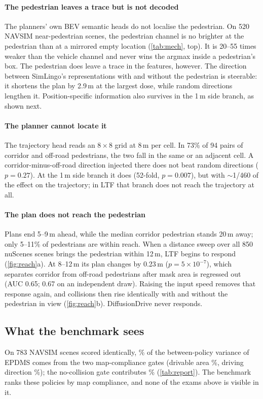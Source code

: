 \paragraph{The pedestrian leaves a trace but is not decoded}
The planners' own BEV semantic heads do not localise the pedestrian. On 520 NAVSIM near-pedestrian
scenes, the pedestrian channel is no brighter at the pedestrian than at a mirrored empty location
(\cref{tab:mech}, top). It is 20--55 times weaker than the vehicle channel and never wins the argmax
inside a pedestrian's box. The pedestrian does leave a trace in the features, however. The direction
between SimLingo's representations with and without the pedestrian is steerable: it shortens the plan
by 2.9\,m at the largest dose, while random directions lengthen it. Position-specific information also
survives in the 1\,m side branch, as shown next.

\paragraph{The planner cannot locate it}
The trajectory head reads an $8\times8$ grid at 8\,m per cell. In 73\% of 94 pairs of corridor and
off-road pedestrians, the two fall in the same or an adjacent cell. A corridor-minus-off-road direction
injected there does not beat random directions ($p=0.27$). At the 1\,m side branch it does (52-fold,
$p=0.007$), but with $\sim$1/460 of the effect on the trajectory; in LTF that branch does not reach
the trajectory at all.

\paragraph{The plan does not reach the pedestrian}
Plans end 5--9\,m ahead, while the median corridor pedestrian stands 20\,m away; only 5--11\% of
pedestrians are within reach. When a distance sweep over all 850 nuScenes scenes brings the pedestrian
within 12\,m, LTF begins to respond (\cref{fig:reach}a). At 8--12\,m its
plan changes by 0.23\,m ($p=5\times10^{-7}$), which separates corridor from off-road pedestrians after
mask area is regressed out (AUC 0.65; 0.67 on an independent draw). Raising the input speed removes
that response again, and collisions then rise identically with and without the pedestrian in view
(\cref{fig:reach}b). DiffusionDrive never responds.

\subsection{What the benchmark sees}
On 783 NAVSIM scenes scored identically, \NumMapShare\% of the between-policy variance of EPDMS comes
from the two map-compliance gates (drivable area \NumDacShare\%, driving direction \NumDdcShare\%); the
no-collision gate contributes \NumNCshare\% (\cref{tab:report}). The benchmark ranks these policies by map compliance, and none of the
exams above is visible in it.
